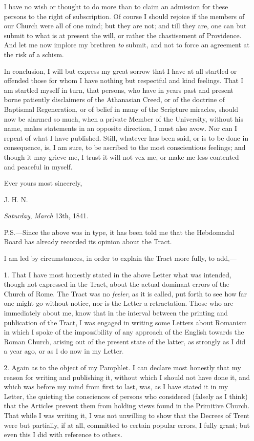 I have no wish or thought to do more than to
claim an admission for these persons to the right of subscription. Of
course I should rejoice if the members of our Church were all of one
mind; but they are not; and till they are, one can but submit to what
is at present the will, or rather the chastisement of Providence. And
let me now implore my brethren \emph{to} submit, and not to
force an agreement at the risk of a schism.

In conclusion, I will but express my great sorrow
that I have at all startled or offended those for whom I have nothing
but respectful and kind feelings. That I am startled myself in turn,
that persons, who have in years past and present borne patiently
disclaimers of the Athanasian Creed, or of the doctrine of Baptismal
Regeneration, or of belief in many of the Scripture miracles, should
now be alarmed so much, when a private Member of the University,
without his name, makes statements in an opposite direction, I must
also avow. Nor can I repent of what I have published. Still, whatever
has been said, or is to be done in consequence, is, I am sure, to be
ascribed to the most conscientious feelings; and though it may grieve
me, I trust it will not vex me, or make me less contented and peaceful
in myself.

Ever yours most sincerely,

J. H. N.

\emph{Saturday}, \emph{March} 13th, 1841.

P.S.—Since the above was in type, it has been
told me that the Hebdomadal Board has already recorded its opinion
about the Tract.


I am led by circumstances, in order to explain
the Tract more fully, to add,—

1. That I have most honestly stated in the above
Letter what was intended, though not expressed in the Tract, about the
actual dominant errors of the Church of Rome. The Tract was no \emph{feeler},
as it is called, put forth to see how far one might go without notice,
nor is the Letter a retractation. Those who are immediately about me,
know that in the interval between the printing and publication of the
Tract, I was engaged in writing some Letters about Romanism in which I
spoke of the impossibility of any approach of the English towards the
Roman Church, arising out of the present state of the latter, as
strongly as I did a year ago, or as I do now in my Letter.

2. Again as to the object of my Pamphlet. I can
declare most honestly that my reason for writing and publishing it,
without which I should not have done it, and which was before my mind
from first to last, was, as I have stated it in my Letter, the
quieting the consciences of persons who considered (falsely as I
think) that the Articles prevent them from holding views found in the
Primitive Church. That while I was writing it, I was not unwilling to
show that the Decrees of Trent were but partially, if at all,
committed to certain popular errors, I fully grant; but even this I
did with reference to others.

